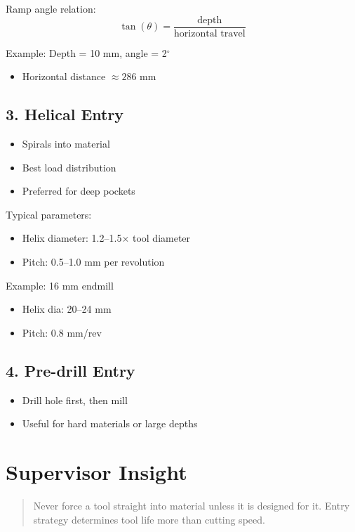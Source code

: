 \documentclass{article}
\begin{document}
Ramp angle relation:
\[
\tan(\theta) = \frac{\text{depth}}{\text{horizontal travel}}
\]

Example:
Depth = 10 mm, angle = 2$^\circ$
\begin{itemize}
\item Horizontal distance $\approx 286$ mm
\end{itemize}

\subsection*{3. Helical Entry}
\begin{itemize}
\item Spirals into material
\item Best load distribution
\item Preferred for deep pockets
\end{itemize}

Typical parameters:
\begin{itemize}
\item Helix diameter: 1.2--1.5$\times$ tool diameter
\item Pitch: 0.5--1.0 mm per revolution
\end{itemize}

Example:
16 mm endmill
\begin{itemize}
\item Helix dia: 20--24 mm
\item Pitch: 0.8 mm/rev
\end{itemize}

\subsection*{4. Pre-drill Entry}
\begin{itemize}
\item Drill hole first, then mill
\item Useful for hard materials or large depths
\end{itemize}

\section*{Supervisor Insight}
\begin{quote}
Never force a tool straight into material unless it is designed for it. Entry strategy determines tool life more than cutting speed.
\end{quote}
\end{document}
